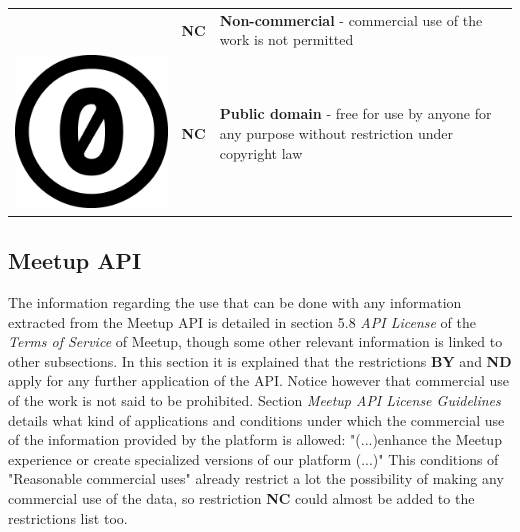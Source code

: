 \begin{table}[]
\begin{tabular}{p{1cm} p{1cm} p{10cm}}
\begin{minipage}{.1\textwidth}
    \end{minipage} & \textbf{NC} & \textbf{Non-commercial} - commercial use of the work is not permitted                                                                                               
    \\
 \begin{minipage}{.1\textwidth}
      \includegraphics[scale=.07]{images/cc_0.png}
    \end{minipage} & \textbf{NC} & \textbf{Public domain} - free for use by anyone for any purpose without restriction under copyright law \\
   \hline
\end{tabular}
\end{table}

\subsection{Meetup API}

The information regarding the use that can be done with any information extracted from the Meetup API is detailed in section 5.8 \textit{API License} of the \textit{Terms of Service} of Meetup, though some other relevant information is linked to other subsections. In this section it is explained that the restrictions \textbf{BY} and \textbf{ND} apply for any further application of the API. Notice however that commercial use of the work is not said to be prohibited. Section \textit{Meetup API License Guidelines} details what kind of applications and conditions under which the commercial use of the information provided by the platform is allowed: "(...)enhance the Meetup experience or create specialized versions of our platform (...)" This conditions of "Reasonable commercial uses" already restrict a lot the possibility of making any commercial use of the data, so restriction \textbf{NC} could almost be added to the restrictions list too.

